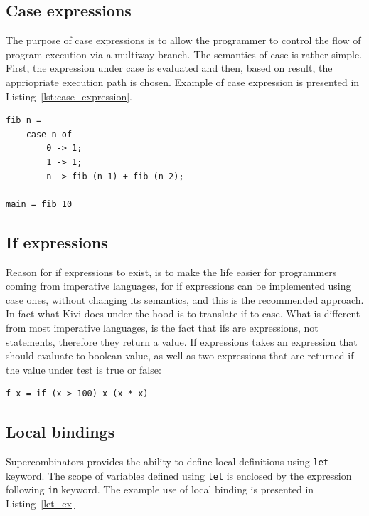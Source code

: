 \documentclass[12pt,a4paper]{report}
\begin{document}
\subsection{Case expressions}
The purpose of case expressions is to allow the programmer to control the flow
of program execution via a multiway branch. The semantics of case is rather
simple. First, the expression under case is evaluated and then, based on result,
the appriopriate execution path is chosen. Example of case expression is
presented in Listing~\ref{lst:case_expression}.

\vspace*{0.2in}
\begin{lstlisting}[style=haskell,label=lst:case_expression,caption={Fibonacci with case}]
fib n =
    case n of
        0 -> 1;
        1 -> 1;
        n -> fib (n-1) + fib (n-2);

main = fib 10
\end{lstlisting}

\subsection{If expressions}
Reason for if expressions to exist, is to make the life easier for programmers
coming from imperative languages, for if expressions can be implemented using
case ones, without changing its semantics, and this is the recommended
approach.  In fact what Kivi does under the hood is to translate if to case.
What is different from most imperative languages, is the fact that ifs are
expressions, not statements, therefore they return a value. If expressions
takes an expression that should evaluate to boolean value, as well as two
expressions that are returned if the value under test is true or
false:

\vspace*{0.2in}
\begin{lstlisting}[style=haskell,label=lst:if_expression,caption={Fibonacci with case}]
f x = if (x > 100) x (x * x)
\end{lstlisting}

\subsection{Local bindings}
Supercombinators provides the ability to define local definitions using
\texttt{let} keyword. The scope of variables defined using \texttt{let} is
enclosed by the expression following \texttt{in} keyword. The example use of
local binding is presented in Listing~\ref{let_ex}
\end{document}
